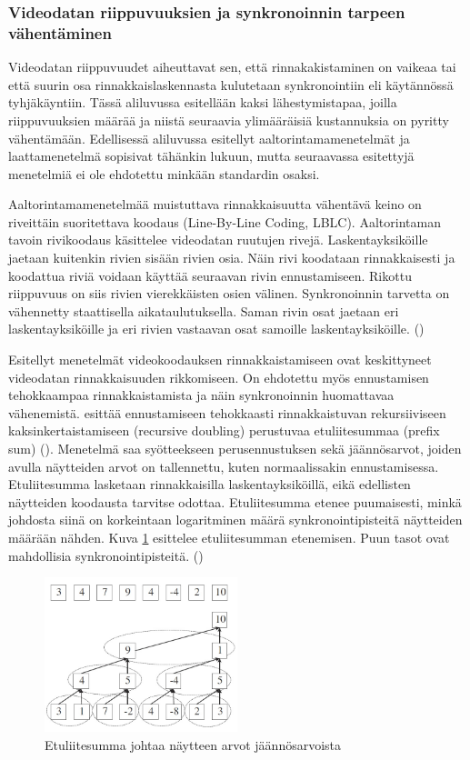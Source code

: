 \subsubsection{Videodatan riippuvuuksien ja synkronoinnin tarpeen vähentäminen}

Videodatan riippuvuudet aiheuttavat sen, että rinnakakistaminen on vaikeaa tai
että suurin osa rinnakkaislaskennasta kulutetaan synkronointiin eli käytännössä
tyhjäkäyntiin. Tässä aliluvussa esitellään kaksi lähestymistapaa, joilla
riippuvuuksien määrää ja niistä seuraavia ylimääräisiä kustannuksia on pyritty
vähentämään. Edellisessä aliluvussa esitellyt aaltorintamamenetelmät ja
laattamenetelmä sopisivat tähänkin lukuun, mutta seuraavassa esitettyjä
menetelmiä ei ole ehdotettu minkään standardin osaksi.

Aaltorintamamenetelmää muistuttava rinnakkaisuutta vähentävä keino on riveittäin
suoritettava koodaus (Line-By-Line Coding, LBLC). Aaltorintaman tavoin
rivikoodaus käsittelee videodatan ruutujen rivejä. Laskentayksiköille jaetaan
kuitenkin rivien sisään rivien osia. Näin rivi koodataan rinnakkaisesti ja
koodattua riviä voidaan käyttää seuraavan rivin ennustamiseen. Rikottu
riippuvuus on siis rivien vierekkäisten osien välinen. Synkronoinnin tarvetta
on vähennetty staattisella aikataulutuksella. Saman rivin osat jaetaan eri
laskentayksiköille ja eri rivien vastaavan osat samoille laskentayksiköille.
(\citealt{xu})

Esitellyt menetelmät videokoodauksen rinnakkaistamiseen ovat keskittyneet
videodatan rinnakkaisuuden rikkomiseen. On ehdotettu myös ennustamisen
tehokkaampaa rinnakkaistamista ja näin synkronoinnin huomattavaa vähenemistä.
\citealt{pieters} esittää ennustamiseen tehokkaasti rinnakkaistuvan
rekursiiviseen kaksinkertaistamiseen (recursive doubling) perustuvaa
etuliitesummaa (prefix sum) (\citealt{blelloch}). Menetelmä saa syötteekseen
perusennustuksen sekä jäännösarvot, joiden avulla näytteiden arvot on
tallennettu, kuten normaalissakin ennustamisessa. Etuliitesumma lasketaan
rinnakkaisilla laskentayksiköillä, eikä edellisten näytteiden koodausta
tarvitse odottaa. Etuliitesumma etenee puumaisesti, minkä johdosta siinä on
korkeintaan logaritminen määrä synkronointipisteitä näytteiden määrään nähden.
Kuva \ref{fig:prefix_sum} esittelee etuliitesumman etenemisen. Puun tasot ovat
mahdollisia synkronointipisteitä. (\citealt{pieters})

\begin{figure}[ht]
	\centering
	\includegraphics[width=0.5\textwidth]{prefix_sum.jpg}
	\caption{Etuliitesumma johtaa näytteen arvot jäännösarvoista}
	\label{fig:prefix_sum}
\end{figure}


